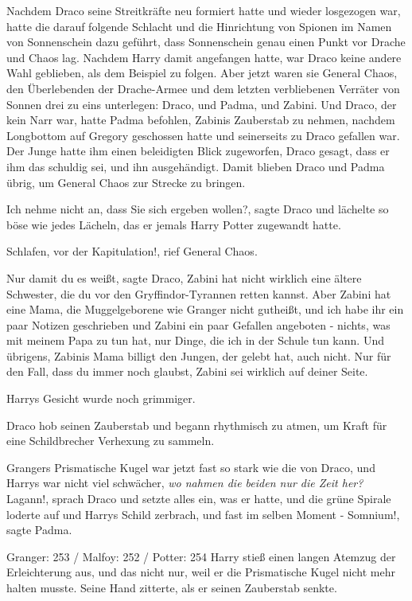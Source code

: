 Nachdem Draco seine Streitkräfte neu formiert hatte und wieder losgezogen war,
hatte die darauf folgende Schlacht und die Hinrichtung von Spionen im Namen von
Sonnenschein dazu geführt, dass Sonnenschein genau einen Punkt vor Drache und
Chaos lag. Nachdem Harry damit angefangen hatte, war Draco keine andere Wahl
geblieben, als dem Beispiel zu folgen. Aber jetzt waren sie General Chaos, den
Überlebenden der Drache-Armee und dem letzten verbliebenen Verräter von Sonnen
drei zu eins unterlegen: Draco, und Padma, und Zabini. Und Draco, der kein Narr
war, hatte Padma befohlen, Zabinis Zauberstab zu nehmen, nachdem Longbottom auf
Gregory geschossen hatte und seinerseits zu Draco gefallen war. Der Junge hatte
ihm einen beleidigten Blick zugeworfen, Draco gesagt, dass er ihm das schuldig
sei, und ihn ausgehändigt. Damit blieben Draco und Padma übrig, um General Chaos
zur Strecke zu bringen.

\glqq{}Ich nehme nicht an, dass Sie sich ergeben wollen?\grqq{}, sagte Draco und
lächelte so böse wie jedes Lächeln, das er jemals Harry Potter zugewandt hatte.

\glqq{}Schlafen, vor der Kapitulation!\grqq{}, rief General Chaos.

\glqq{}Nur damit du es weißt\grqq{}, sagte Draco, \glqq{}Zabini hat nicht wirklich
eine ältere Schwester, die du vor den Gryffindor-Tyrannen retten kannst. Aber
Zabini hat eine Mama, die Muggelgeborene wie Granger nicht gutheißt, und ich
habe ihr ein paar Notizen geschrieben und Zabini ein paar Gefallen angeboten -
nichts, was mit meinem Papa zu tun hat, nur Dinge, die ich in der Schule tun
kann. Und übrigens, Zabinis Mama billigt den Jungen, der gelebt hat, auch
nicht. Nur für den Fall, dass du immer noch glaubst, Zabini sei wirklich auf
deiner Seite.\grqq{}

Harrys Gesicht wurde noch grimmiger.

Draco hob seinen Zauberstab und begann rhythmisch zu atmen, um Kraft für eine
Schildbrecher Verhexung zu sammeln.

Grangers Prismatische Kugel war jetzt fast so stark wie die von Draco, und
Harrys war nicht viel schwächer, \emph{wo nahmen die beiden nur die Zeit her?}
\glqq{}Lagann!\grqq{}, sprach Draco und setzte alles ein, was er hatte, und die
grüne Spirale loderte auf und Harrys Schild zerbrach, und fast im selben Moment
- \glqq{}Somnium!\grqq{}, sagte Padma.

Granger: 253 / Malfoy: 252 / Potter: 254 Harry stieß einen langen Atemzug der
Erleichterung aus, und das nicht nur, weil er die Prismatische Kugel nicht mehr
halten musste. Seine Hand zitterte, als er seinen Zauberstab senkte.

